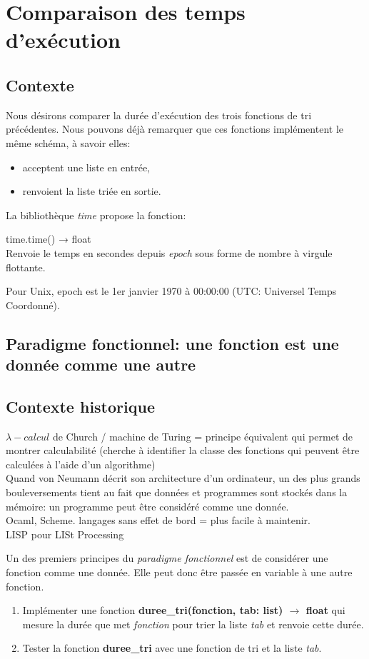 \documentclass[a4paper,11pt]{article}
\begin{document}
\begin{Form}
\section{Comparaison des temps d'exécution}
\subsection{Contexte}
Nous désirons comparer la durée d'exécution des trois fonctions de tri précédentes. Nous pouvons déjà remarquer que ces fonctions implémentent le même schéma, à savoir elles:
\begin{itemize}
\item acceptent une liste en entrée,
\item renvoient la liste triée en sortie.
\end{itemize}
\medskip
La bibliothèque \emph{time} propose la fonction:
\begin{framed}
time.time() → float
\\Renvoie le temps en secondes depuis \emph{epoch} sous forme de nombre à virgule flottante. 
\end{framed}
\begin{commentprof}
Pour Unix, epoch est le 1er janvier 1970 à 00:00:00 (UTC: Universel Temps Coordonné). 
\end{commentprof}
\subsection{Paradigme fonctionnel: une fonction est une donnée comme une autre}
\begin{commentprof}
\section*{Contexte historique}
$\lambda-calcul$ de Church / machine de Turing = principe équivalent qui permet de montrer calculabilité (cherche à identifier la classe des fonctions qui peuvent être calculées à l'aide d'un algorithme)\\
Quand von Neumann décrit son architecture d'un ordinateur, un des plus grands bouleversements tient au fait que données et programmes sont stockés dans la mémoire: un programme peut être considéré comme une donnée.\\
Ocaml, Scheme. langages sans effet de bord = plus facile à maintenir.\\
LISP pour LISt Processing
\end{commentprof}
Un des premiers principes du \emph{paradigme fonctionnel} est de considérer une fonction comme une donnée. Elle peut donc être passée en variable à une autre fonction.
\begin{activite}
\begin{enumerate}
\item Implémenter une fonction \textbf{duree\_tri(fonction, tab: list) $\rightarrow$ float} qui mesure la durée que met \emph{fonction} pour trier la liste \emph{tab} et renvoie cette durée.
\item Tester la fonction \textbf{duree\_tri} avec une fonction de tri et la liste \emph{tab}. 
\end{enumerate}
\end{activite}

\end{Form}
\end{document}

